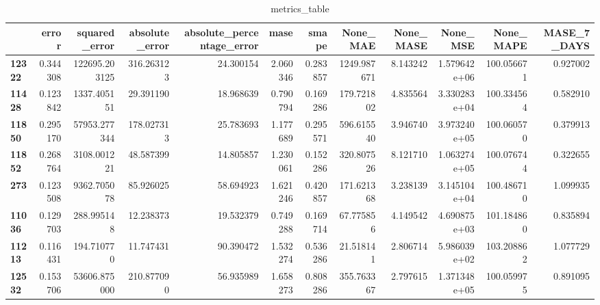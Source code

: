 \begin{table}[h]
\centering
\caption{metrics_table}
\label{table:Experiment with CNN AE and LSTM hybrid method. Local, multivariate, dataset seasonal. Tuned with LSTM Local multivariate dataset seasonal}
\begin{tabular}{lrrrrrrrrrrr}
\toprule
{} &     error &  squared\_error &  absolute\_error &  absolute\_percentage\_error &      mase &     smape &     None\_MAE &  None\_MASE &      None\_MSE &   None\_MAPE &  MASE\_7\_DAYS \\
\midrule
\textbf{12322} &  0.344308 &  122695.203125 &      316.263123 &                  24.300154 &  2.060346 &  0.283857 &  1249.987671 &   8.143242 &  1.579642e+06 &  100.056671 &     0.927002 \\
\textbf{11428} &  0.123842 &    1337.405151 &       29.391190 &                  18.968639 &  0.790794 &  0.169286 &   179.721802 &   4.835564 &  3.330283e+04 &  100.334564 &     0.582910 \\
\textbf{11850} &  0.295170 &   57953.277344 &      178.027313 &                  25.783693 &  1.177689 &  0.295571 &   596.615540 &   3.946740 &  3.973240e+05 &  100.060570 &     0.379913 \\
\textbf{11852} &  0.268764 &    3108.001221 &       48.587399 &                  14.805857 &  1.230061 &  0.152286 &   320.807526 &   8.121710 &  1.063274e+05 &  100.076744 &     0.322655 \\
\textbf{273  } &  0.123508 &    9362.705078 &       85.926025 &                  58.694923 &  1.621246 &  0.420857 &   171.621368 &   3.238139 &  3.145104e+04 &  100.486710 &     1.099935 \\
\textbf{11036} &  0.129703 &     288.995148 &       12.238373 &                  19.532379 &  0.749288 &  0.169714 &    67.775856 &   4.149542 &  4.690875e+03 &  101.184860 &     0.835894 \\
\textbf{11213} &  0.116431 &     194.710770 &       11.747431 &                  90.390472 &  1.532274 &  0.536286 &    21.518141 &   2.806714 &  5.986039e+02 &  103.208862 &     1.077729 \\
\textbf{12532} &  0.153706 &   53606.875000 &      210.877090 &                  56.935989 &  1.658273 &  0.808286 &   355.763367 &   2.797615 &  1.371348e+05 &  100.059975 &     0.891095 \\
\bottomrule
\end{tabular}
\end{table}
